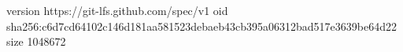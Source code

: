 version https://git-lfs.github.com/spec/v1
oid sha256:c6d7cd64102c146d181aa581523debaeb43cb395a06312bad517e3639be64d22
size 1048672
